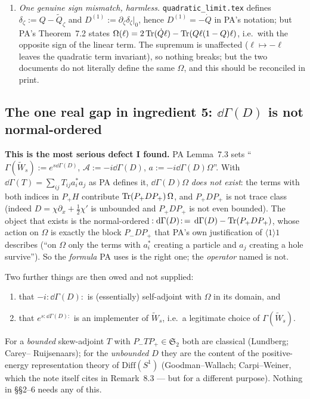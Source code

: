 \documentclass[11pt]{article}
\newcommand{\Wt}{\widetilde W}
\newcommand{\Pp}{P_+}\newcommand{\Pm}{P_-}
\providecommand{\Om}{\Omega}\providecommand{\Gm}{\Gamma}\providecommand{\Qt}{\widetilde Q}
\providecommand{\Stwo}{\mathfrak S_2}\providecommand{\Sone}{\mathfrak S_1}
\begin{document}
\begin{enumerate}[label=(\alph*),leftmargin=2em]
 ($Q$ is quadratic in the field and $\dd/\dd\zeta=3\,\dd/\dd s$), and the two independent
 determinations of the same number agree to $4$ parts in $10^4$.  This is the single most convincing
 external check in the whole file.
\item \emph{One genuine sign mismatch, harmless.}  \texttt{quadratic\_limit.tex} defines
 $\delta_\zeta:=Q-\Qt_\zeta$ and $D^{(1)}:=\partial_\zeta\delta_\zeta|_0$, hence
 $D^{(1)}=-\dot Q$ in PA's notation; but PA's Theorem~7.2 states $\Omega(\ell)=2\operatorname{Tr}(\dot Q\ell)
 -\operatorname{Tr}(Q\ell(1-Q)\ell)$, i.e.\ with the opposite sign of the linear term.  The supremum is unaffected
 ($\ell\mapsto-\ell$ leaves the quadratic term invariant), so nothing breaks; but the two documents
 do not literally define the same $\Omega$, and this should be reconciled in print.
\end{enumerate}

\subsection{The one real gap in ingredient 5: $\dd\Gm(D)$ is not normal-ordered}
\textbf{This is the most serious defect I found.}  PA Lemma~7.3 sets
``$\Gm(\Wt_s):=e^{s\dd\Gm(D)}$, $\mathcal A:=-i\dd\Gm(D)$, $a:=-i\dd\Gm(D)\Om$''.  With
$\dd\Gm(T)=\sum_{ij}T_{ij}a_i^*a_j$ as PA defines it, $\dd\Gm(D)\Om$ \emph{does not exist}: the
terms with both indices in $\Pp H$ contribute $\Tr(\Pp D\Pp)\,\Om$, and $\Pp D\Pp$ is not trace class
(indeed $D=\chi\partial_x+\frac12\chi'$ is unbounded and $\Pp D\Pp$ is not even bounded).  The object
that exists is the normal-ordered
$\!:\!\dd\Gm(D)\!:\,=\dd\Gm(D)-\Tr(\Pp D\Pp)$, whose action on $\Om$ is exactly the block
$\Pm D\Pp$ that PA's own justification of $\langle1\rangle1$ describes (``on $\Om$ only the terms
with $a_i^*$ creating a particle and $a_j$ creating a hole survive'').  So the \emph{formula} PA uses
is the right one; the \emph{operator} named is not.

Two further things are then owed and not supplied:
\begin{enumerate}[label=(\roman*),leftmargin=2em]
\item that $-i\!:\!\dd\Gm(D)\!:$ is (essentially) self-adjoint with $\Om$ in its domain, and
\item that $e^{s:\dd\Gm(D):}$ is an implementer of $\Wt_s$, i.e.\ a legitimate choice of
 $\Gm(\Wt_s)$.
\end{enumerate}
For a \emph{bounded} skew-adjoint $T$ with $\Pm T\Pp\in\Stwo$ both are classical (Lundberg; Carey--
Ruijsenaars); for the \emph{unbounded} $D$ they are the content of the positive-energy
representation theory of $\mathrm{Diff}(S^1)$ (Goodman--Wallach; Carpi--Weiner, which the note itself
cites in Remark~8.3 --- but for a different purpose).  Nothing in \S\S2--6 needs any of this.
\end{document}
